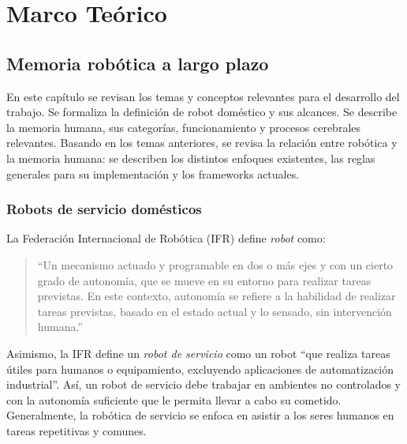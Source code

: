 \chapter{Marco Teórico}\label{chapter:theory}




\section{Memoria robótica a largo plazo}\label{chapter:memory}

En este capítulo se revisan los temas y conceptos relevantes para el desarrollo del trabajo. Se formaliza la definición de robot doméstico y sus alcances. Se describe la memoria humana, sus categorías, funcionamiento y procesos cerebrales relevantes. Basando en los temas anteriores, se revisa la relación entre robótica y la memoria humana: se describen los distintos enfoques existentes, las reglas generales para su implementación y los frameworks actuales.


\subsection{Robots de servicio domésticos}\label{sec:domestic_robots}
La Federación Internacional de Robótica (IFR) \cite{IFR} define \textit{robot} como:
\begin{quotation}
	``Un mecanismo actuado y programable en dos o más ejes y con un cierto grado de autonomía, que se mueve en su entorno para realizar tareas previstas. En este contexto, autonomía se refiere a la habilidad de realizar tareas previstas, basado en el estado actual y lo sensado, sin intervención humana.''
\end{quotation}

Asimismo, la IFR define un \textit{robot de servicio} como un robot ``que realiza tareas útiles para humanos o equipamiento, excluyendo aplicaciones de automatización industrial''. Así, un robot de servicio debe trabajar en ambientes no controlados y con la autonomía suficiente que le permita llevar a cabo su cometido. Generalmente, la robótica de servicio se enfoca en asistir a los seres humanos en tareas repetitivas y comunes.

